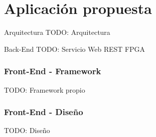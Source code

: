 \section{Aplicación propuesta}

\begin{frame}{Arquitectura}
  TODO: Arquitectura
\end{frame}

\begin{frame}{Back-End}
  TODO: Servicio Web REST FPGA
\end{frame}

\begin{frame}[fragile]
  \frametitle{Front-End - Framework}
  TODO: Framework propio
\end{frame}

\begin{frame}[fragile]
  \frametitle{Front-End - Diseño}
  TODO: Diseño
\end{frame}
